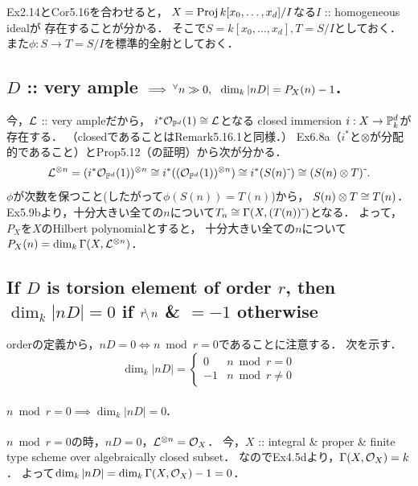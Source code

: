 \documentclass[a4paper]{jsarticle}
\begin{document}
    Ex2.14とCor5.16を合わせると，
    $X=\operatorname{Proj} k[x_0, \dots, x_d]/I$なる$I$ :: homogeneous idealが
    存在することが分かる．
    そこで$S=k[x_0, \dots, x_d], T=S/I$としておく．
    また$\phi: S \to T=S/I$を標準的全射としておく．

    \subsection{$D$ :: very ample $\implies {}^{\forall} n \gg 0,~~ \dim_k |nD|=P_X(n)-1$.}
    今，$\mathcal{L}$ :: very ampleだから，
    $i^* \mathcal{O}_{\mathbb{P}^d}(1) \cong \mathcal{L}$となる
    closed immersion $i: X \to \mathbb{P}^d_k$が存在する．
    （closedであることはRemark5.16.1と同様．）
    Ex6.8a（$i^*$と$\otimes$が分配的であること）とProp5.12（の証明）から次が分かる．
    \[
        \mathcal{L}^{\otimes n}
        =(i^* \mathcal{O}_{\mathbb{P}^d}(1))^{\otimes n}
        \cong i^* ((\mathcal{O}_{\mathbb{P}^d}(1))^{\otimes n})
        \cong i^* (S(n) \,\tilde{}\,)
        \cong (S(n) \otimes T)\,\tilde{}\,.
    \]
    $\phi$が次数を保つこと(したがって$\phi(S(n))=T(n)$)から，
    $S(n) \otimes T \cong T(n)$．
    Ex5.9bより，十分大きい全ての$n$について$T_n \cong \Gamma(X, (T(n))\,\tilde{}\,)$となる．
    よって，
    $P_X$を$X$のHilbert polynomialとすると，
    十分大きい全ての$n$について$P_X(n)=\dim_k \Gamma(X, \mathcal{L}^{\otimes n})$．

    \subsection{If $D$ is torsion element of order $r$,
        then $\dim_k |nD|=0$ if $r \!\backslash\, n$ \& $=-1$ otherwise}

    orderの定義から，$nD=0 \iff n \bmod r=0$であることに注意する．
    次を示す．
    \[
        \dim_k |nD|=
        \begin{cases}{}
            0   & n \bmod r=0 \\
            -1  & n \bmod r \neq 0
        \end{cases}
    \]

    \paragraph{$n \bmod r=0 \implies \dim_k |nD|=0$.}
    $n \bmod r=0$の時，$nD=0$，$\mathcal{L}^{\otimes n}=\mathcal{O}_X$．
    今，$X$ :: integral \& proper \& finite type scheme over algebraically closed subset．
    なのでEx4.5dより，$\Gamma(X, \mathcal{O}_X)=k$．
    よって$\dim_k |nD|=\dim_k \Gamma(X, \mathcal{O}_X)-1=0$．
\end{document}
